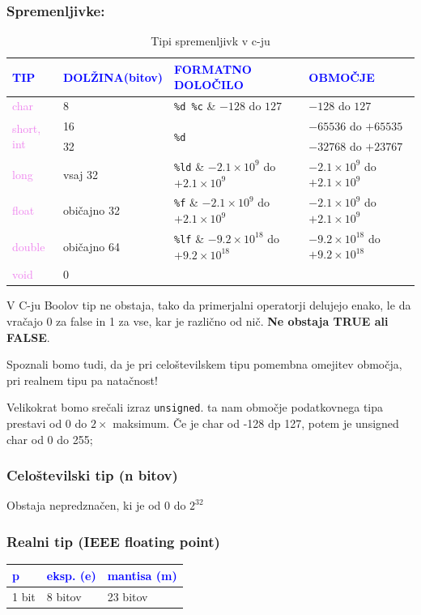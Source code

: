 \documentclass[a4paper, 12pt]{article}
\begin{document}
\subsubsection{Spremenljivke:}
\begin{table}[!htbp]
	\centering
	\begin{tabular}[b]{|p{3cm}|p{3cm}|p{3cm}|p{4.5cm}|}
		\hline \textcolor{blue}{TIP} & \textcolor{blue}{DOLŽINA(bitov)} & \textcolor{blue}{FORMATNO DOLOČILO} & \textcolor{blue}{OBMOČJE} \\ \hline\hline
		\textcolor{violet}{char} & 8 & \verb|%d %c| & $-128$ do $127$ \\
		\multirow{2}{*}{\textcolor{violet}{short, int}} & 16 & \multirow{2}{*}{\texttt{\%d}} & $-65536$ do $+65535$ \\
		& 32 && $-32768$ do $+23767$ \\
		\textcolor{violet}{long} & vsaj 32 & \verb|%ld| & $-2.1\times10^9$ do $+2.1\times10^9$\\
		\textcolor{violet}{float} & običajno 32 & \verb|%f| & $-2.1\times10^9$ do $+2.1\times10^9$\\
		\textcolor{violet}{double} & običajno 64 & \verb|%lf| & $-9.2\times10^{18}$ do $+9.2\times10^{18}$ \\
		\textcolor{violet}{void} & 0 & & \\ \hline
	\end{tabular}
	\caption{Tipi spremenljivk v c-ju}
\end{table}
%
V C-ju Boolov tip ne obstaja, tako da primerjalni operatorji delujejo enako, le da vračajo 0 za false in 1 za vse, kar je različno od nič. \textbf{Ne obstaja TRUE ali FALSE}.\

Spoznali bomo tudi, da je pri celoštevilskem tipu pomembna omejitev območja, pri realnem tipu pa natačnost!

Velikokrat bomo srečali izraz \lstinline|unsigned|. ta nam območje podatkovnega tipa prestavi od 0 do $2\times$ maksimum. Če je char od -128 dp 127, potem je unsigned char od 0 do 255;

\subsubsection{Celoštevilski tip (n bitov)}
Obstaja nepredznačen, ki je od 0 do $2^{32}$

\subsubsection{Realni tip (IEEE floating point)}
\begin{table}[!htbp]
	\centering
	\begin{tabular}{|l|l|l|}
		\hline \textcolor{blue}{p} & \textcolor{blue}{eksp. (e)} & \textcolor{blue}{mantisa (m)} \\ \hline
		1 bit & 8 bitov & 23 bitov \\ \hline
	\end{tabular}
\end{table}
\end{document}
